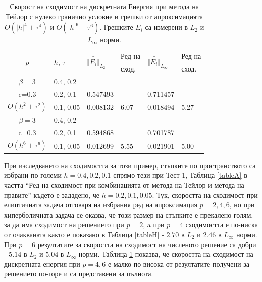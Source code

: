 \documentclass[a4paper]{article}
\theoremstyle{remark}
\begin{document}
\begin{table}[ht]
\centering
\small
		\begin{tabular}{||c|l|ll|ll||}
			\hline
			\hline
      \multirow{2  }{*}{ $p$ }        & \multirow{2  }{*}{$h$, $\tau$}  &  	\multirow{2  }{*}{ $\Vert \bar{\bar{ E_i}} \Vert_{L_2}$ }	&Ред на	& \multirow{2  }{*}{ $\Vert \bar{\bar{ E_i}} \Vert_{L_\infty}$ } 		&Ред на   \\
	                                        &                                                & 							 					&  сход. 	& 								       					& сход. \\
   			\hline 
					\hline 
       $\beta=3$       	&0.4, 0.2     		&             	&           &           		&   \\
                  c=0.3    	&0.2, 0.1     		& 0.547493 	&           &0.711457  		&   \\
$O(h^2+ \tau^2)$ 	&0.1, 0.05   		& 0.008132  	& 6.07  	& 0.018494  		& 5.27 \\
\hline
  $\beta=3$     	 	&0.4, 0.2   		&            	&         	&                  	&      \\
      c=0.3                 	&0.2, 0.1   		&0.594868	&         	& 0.701787      	&       \\
   $O(h^6+ \tau^6)$ &0.1, 0.05  		& 0.012699 	& 5.55 	& 0.021901  		& 5.00       \\
\hline
\hline 
		\end{tabular}
		\caption{Скорост на сходимост на дискретната Енергия при метода на Тейлор с нулево гранично условие и грешки от апроксимацията $O(|h|^{4} + \tau^4 )$ и $O(|h|^{6} + \tau^6 )$. Грешките $\bar{\bar{ E_i}}$ са измерени в $L_2$ и $L_\infty$ норми.}
\label{tableI}
\end{table}
\FloatBarrier

При изследването на сходимостта за този пример, стъпките по пространството са избрани по-големи $h=0.4, 0.2, 0.1$ спрямо тези при Тест 1, Таблица \ref{tableA} в частта ``Ред на сходимост при комбинацията от метода на Тейлор и метода на правите'' където е зададено, че $h=0.2, 0.1, 0.05$. Тук, скоростта на сходимост при елиптичната задача отговаря на избрания ред на апроксимация $p=2,4,6$, но при хиперболичната задача се оказва, че този размер на стъпките е прекалено голям, за да има сходимост на решението при $p=2$, a при $p=4$ сходимостта е по-ниска от очакваната както е показано в Таблица \ref{tableH} - $2.70$ в $L_2$ и $2.46$ в $L_\infty$ норми. При $p=6$ резултатите за скоростта на сходимост на численото решение са добри - $5.14$ в $L_2$ и $5.04$ в $L_\infty$ норми. Таблица \ref{tableI} показва, че скоростта на сходимост на дискретната енергия при $p=4,6$ е малко по-висока от резултатите получени за решението по-горе и са представени за пълнота.
\end{document}
